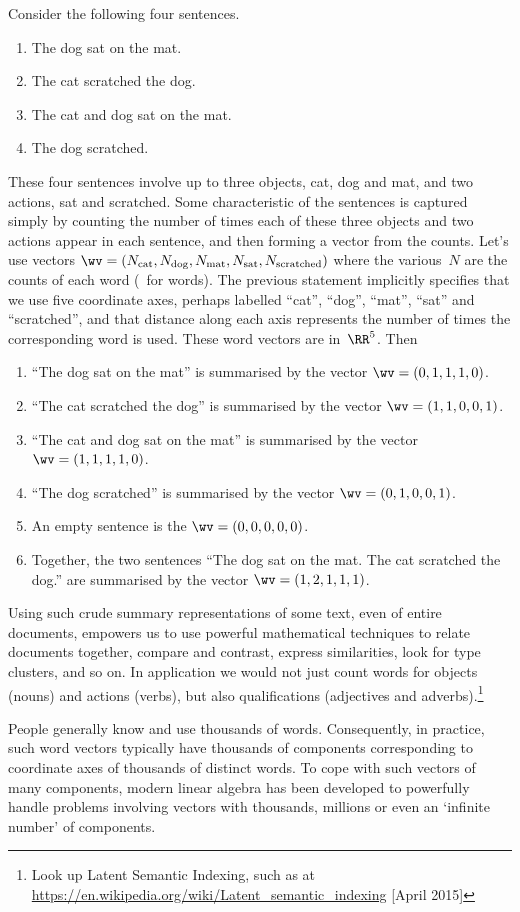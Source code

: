 \begin{example} \label{eg:deflsv}
Consider the following four sentences.
\begin{enumerate}
\item The dog sat on the mat.
\item The cat scratched the dog.
\item The cat and dog sat on the mat.
\item The dog scratched.
\end{enumerate}
These four sentences involve up to three objects, cat, dog and mat, and two actions, sat and scratched.  
Some characteristic of the sentences is captured simply by counting the number of times each of these three objects and two actions appear in each sentence, and then forming a vector from the counts.
Let's use vectors \(\wv=(N_{\text{cat}}, N_{\text{dog}}, N_{\text{mat}}, N_{\text{sat}}, N_{\text{scratched}})\) where the various~\(N\) are the counts of each word (\wv~for words). 
The previous statement implicitly specifies that we use five coordinate axes, perhaps labelled ``cat'', ``dog'', ``mat'', ``sat'' and ``scratched'', and that distance along each axis represents the number of times the corresponding word is used.
These word vectors are in~\(\RR^5\).
Then
\begin{enumerate}
\item ``The dog sat on the mat'' is summarised by the vector \(\wv=(0,1,1,1,0)\).
\item ``The cat scratched the dog'' is summarised by the vector \(\wv=(1,1,0,0,1)\).
\item ``The cat and dog sat on the mat'' is summarised by the vector \(\wv=(1,1,1,1,0)\).
\item ``The dog scratched'' is summarised by the vector \(\wv=(0,1,0,0,1)\).
\item An empty sentence is the  \(\wv=(0,0,0,0,0)\).
\item Together, the two sentences ``The dog sat on the mat.
 The cat scratched the dog.'' are summarised by the vector \(\wv=(1,2,1,1,1)\).
\end{enumerate}
Using such crude summary representations of some text, even of entire documents, empowers us to use powerful mathematical techniques to relate documents together, compare and contrast, express similarities, look for type clusters, and so on.
In application we would not just count words for objects (nouns) and actions (verbs), but also qualifications (adjectives and adverbs).\footnote{Look up Latent Semantic Indexing, such as at \url{https://en.wikipedia.org/wiki/Latent_semantic_indexing} [April 2015]}

People generally know and use thousands of words.
Consequently, in practice, such word vectors typically have thousands of components corresponding to coordinate axes of thousands of distinct words.
To cope with such vectors of many components, modern linear algebra has been developed to powerfully handle problems involving vectors with thousands, millions or even an `infinite number' of components.
\end{example}

